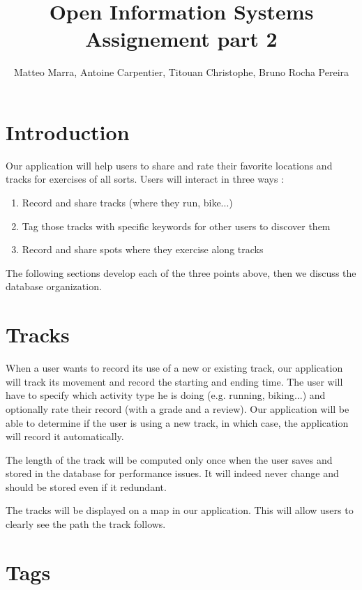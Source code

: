 \documentclass[a4paper]{article}
\title{Open Information Systems\\Assignement part 2 }
\author{Matteo Marra, Antoine Carpentier, Titouan Christophe, Bruno Rocha Pereira}
\begin{document}
\maketitle


\section{Introduction}

Our application will help users to share and rate their favorite locations and tracks for exercises of all sorts. Users will interact in three ways : 

\begin{enumerate}
    \item Record and share tracks (where they run, bike...)
    \item Tag those tracks with specific keywords for other users to discover them
    \item Record and share spots where they exercise along tracks
\end{enumerate}

The following sections develop each of the three points above, then we discuss
the database organization.

\section{Tracks}

When a user wants to record its use of a new or existing track, our application will track its movement and record the starting and ending time. The user will have to specify which activity type he is doing (e.g. running, biking...) and optionally rate their record (with a grade and a review). Our application will be able to determine if the user is using a new track, in which case, the application will record it automatically.

The length of the track will be computed only once when the user saves and stored in the database for performance issues. It will indeed never change and should be stored even if it redundant.

The tracks will be displayed on a map in our application. This will allow users to clearly see the path the track follows.

\section{Tags}
\end{document}
